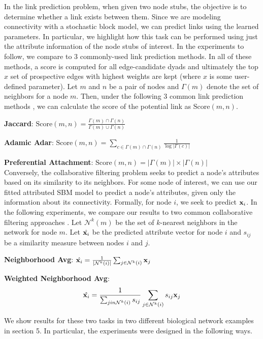 In the link prediction problem, when given two node stubs, the objective is to determine whether a link exists between them. Since we are modeling connectivity with a stochastic block model, we can predict links using the learned parameters.  In particular, we highlight how this task can be performed using just the attribute information of the node stubs of interest. In the experiments to follow, we compare to 3 commonly-used link prediction methods. In all of these methods, a score is computed for all edge-candidate dyads and ultimately the top $x$ set of prospective edges with highest weights are kept (where $x$ is some user-defined parameter). Let $m$ and $n$ be a pair of nodes and $\Gamma(m)$ denote the set of neighbors for a node $m$. Then, under the following 3 common  link prediction methods \cite{linkPredReview}, we can calculate the score of the potential link as $\text{Score}(m,n)$.

{\bf Jaccard}: $\text{Score}(m,n)= \frac{\Gamma(m) \cap \Gamma(n)}{\Gamma(m)\cup \Gamma(n)}$

{\bf Adamic Adar}: $\text{Score}(m,n)=\sum_{c \in \Gamma(m) \cap \Gamma(n)}\frac{1}{\log |\Gamma(c)|}$

{\bf Preferential Attachment}: $\text{Score}(m,n)=|\Gamma(m)|\times |\Gamma(n)|$\\

Conversely, the collaborative filtering problem seeks to predict a node's attributes based on its similarity to its neighbors. For some node of interest, we can use our fitted attributed SBM model to predict a node's attributes, given only the information about its connectivity. Formally, for node $i$, we seek to predict ${\bf x}_{i}$. In the following experiments, we compare our results to two common collaborative filtering approaches \cite{collabFilterReview}. Let $\mathcal{N}^{k}(m)$ be the set of $k$-nearest neighbors in the network for node $m$. Let $\hat{{\bf x}_{i}}$ be the predicted attribute vector for node $i$ and $s_{ij}$ be a similarity measure between nodes $i$ and $j$. 

{\bf Neighborhood Avg}: $\hat{{\bf x}_{i}}= \frac{1}{|\mathcal{N}^{k}(i)|}\sum_{j \in \mathcal{N}^{k}(i)} {\bf x}_{j}$

{\bf Weighted Neighborhood Avg}: \[\hat{{\bf x}_{i}}=\frac{1}{\sum_{j in \mathcal{N}^{k}(i)}s_{ij}}\sum_{j \in \mathcal{N}^{k}(i)}s_{ij}{\bf x}_{j}\]

We show results for these two tasks in two different biological network examples in section 5. In particular, the experiments were designed in the following ways.

